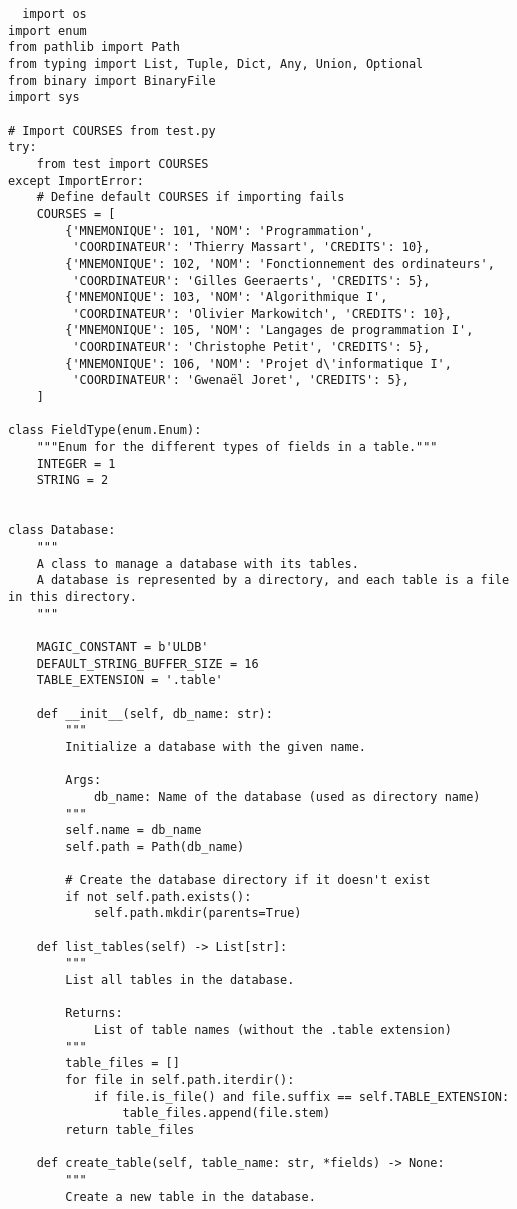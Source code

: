 \documentclass[utf8]{article}
\begin{document}
\begin{verbatim}
  import os
import enum
from pathlib import Path
from typing import List, Tuple, Dict, Any, Union, Optional
from binary import BinaryFile
import sys

# Import COURSES from test.py
try:
    from test import COURSES
except ImportError:
    # Define default COURSES if importing fails
    COURSES = [
        {'MNEMONIQUE': 101, 'NOM': 'Programmation',
         'COORDINATEUR': 'Thierry Massart', 'CREDITS': 10},
        {'MNEMONIQUE': 102, 'NOM': 'Fonctionnement des ordinateurs',
         'COORDINATEUR': 'Gilles Geeraerts', 'CREDITS': 5},
        {'MNEMONIQUE': 103, 'NOM': 'Algorithmique I',
         'COORDINATEUR': 'Olivier Markowitch', 'CREDITS': 10},
        {'MNEMONIQUE': 105, 'NOM': 'Langages de programmation I',
         'COORDINATEUR': 'Christophe Petit', 'CREDITS': 5},
        {'MNEMONIQUE': 106, 'NOM': 'Projet d\'informatique I',
         'COORDINATEUR': 'Gwenaël Joret', 'CREDITS': 5},
    ]

class FieldType(enum.Enum):
    """Enum for the different types of fields in a table."""
    INTEGER = 1
    STRING = 2


class Database:
    """
    A class to manage a database with its tables.
    A database is represented by a directory, and each table is a file in this directory.
    """
    
    MAGIC_CONSTANT = b'ULDB'
    DEFAULT_STRING_BUFFER_SIZE = 16
    TABLE_EXTENSION = '.table'
    
    def __init__(self, db_name: str):
        """
        Initialize a database with the given name.
        
        Args:
            db_name: Name of the database (used as directory name)
        """
        self.name = db_name
        self.path = Path(db_name)
        
        # Create the database directory if it doesn't exist
        if not self.path.exists():
            self.path.mkdir(parents=True)
    
    def list_tables(self) -> List[str]:
        """
        List all tables in the database.
        
        Returns:
            List of table names (without the .table extension)
        """
        table_files = []
        for file in self.path.iterdir():
            if file.is_file() and file.suffix == self.TABLE_EXTENSION:
                table_files.append(file.stem)
        return table_files
    
    def create_table(self, table_name: str, *fields) -> None:
        """
        Create a new table in the database.
        

\end{verbatim}
\end{document}
